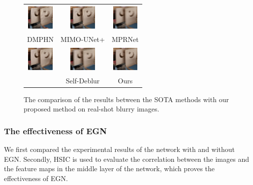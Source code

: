 \begin{sloppypar}
\begin{figure}
\begin{tabular}{ccc}
                \includegraphics[width=1.3cm,height=1.3cm]{./real/000003_blur_DMPHN_patch.png} &  \includegraphics[width=1.3cm,height=1.3cm]{./real/000003_blur_MIMO_patch.png} &    \includegraphics[width=1.3cm,height=1.3cm]{./real/000003_MPRNet_patch.png}       \\
                DMPHN & MIMO-UNet+ & MPRNet \\
                

                \includegraphics[width=1.3cm,height=1.3cm]{./real/000003_blur_patch_AD.png} & 
                \includegraphics[width=1.3cm,height=1.3cm]{./real/000003_blur_2500_Self_Deblur_patch.png} &    
                \includegraphics[width=1.3cm,height=1.3cm]{./real/000003_ours_patch.png}       \\
                \textcolor{black}{\cite{26}} & Self-Deblur & Ours \\
                
        \end{tabular}
        \caption{The comparison of the results between the SOTA methods with our proposed method on real-shot blurry images.}
        \label{figure12}
        \vspace{-0.5em}
\end{figure}
\subsubsection{The effectiveness of EGN}
We first compared the experimental results of the network with and without EGN. Secondly, HSIC\cite{10} is used to evaluate the correlation between the images and the feature maps in the middle layer of the network, which proves the effectiveness of EGN.


\end{sloppypar}
